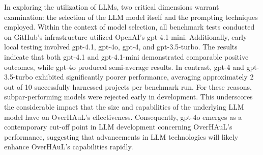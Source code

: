 \documentclass[
  a4paper,
]{scrreprt}
\newenvironment{Shaded}{\begin{snugshade}}{\end{snugshade}}
\newcommand{\ControlFlowTok}[1]{\textcolor[rgb]{0.85,0.12,0.09}{#1}}
\newcommand{\DataTypeTok}[1]{\textcolor[rgb]{0.47,0.16,0.63}{#1}}
\newcommand{\DecValTok}[1]{\textcolor[rgb]{0.47,0.16,0.63}{#1}}
\newcommand{\KeywordTok}[1]{\textcolor[rgb]{0.85,0.12,0.09}{#1}}
\newcommand{\NormalTok}[1]{\textcolor[rgb]{0.33,0.33,0.33}{#1}}
\newcommand{\OperatorTok}[1]{\textcolor[rgb]{0.00,0.46,0.62}{#1}}
\theoremstyle{definition}
\theoremstyle{remark}
\begin{document}
%

In exploring the utilization of LLMs, two critical dimensions warrant
examination: the selection of the LLM model itself and the prompting
techniques employed. Within the context of model selection, all
benchmark tests conducted on GitHub's infrastructure utilized OpenAI's
gpt-4.1-mini. Additionally, early local testing involved gpt-4.1,
gpt-4o, gpt-4, and gpt-3.5-turbo. The results indicate that both gpt-4.1
and gpt-4.1-mini demonstrated comparable positive outcomes, while gpt-4o
produced semi-average results. In contrast, gpt-4 and gpt-3.5-turbo
exhibited significantly poorer performance, averaging approximately 2
out of 10 successfully harnessed projects per benchmark run. For these
reasons, subpar-performing models were rejected early in development.
This underscores the considerable impact that the size and capabilities
of the underlying LLM model have on OverHAuL's effectiveness.
Consequently, gpt-4o emerges as a contemporary cut-off point in LLM
development concerning OverHAuL's performance, suggesting that
advancements in LLM technologies will likely enhance OverHAuL's
capabilities rapidly.
\end{document}
